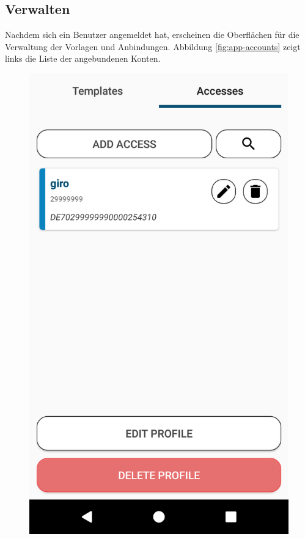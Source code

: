 \subsection{Verwalten}
\label{subsec:app-verwalten}
Nachdem sich ein Benutzer angemeldet hat, erscheinen die Oberflächen für die Verwaltung der Vorlagen und Anbindungen. Abbildung \ref{fig:app-accounts} zeigt links die Liste der angebundenen Konten.

\begin{figure}[h]
  \centering
  \begin{minipage}[b]{0.45\textwidth}
    \includegraphics[width=\textwidth]{bilder/4_appAccounts.png}

\end{minipage}
\end{figure}
